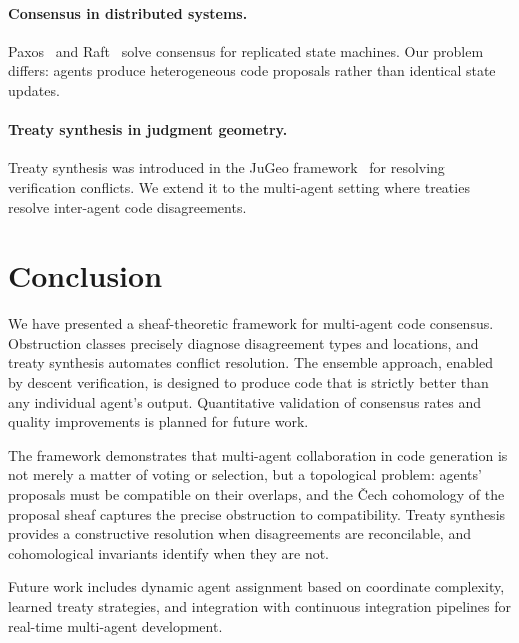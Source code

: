 \documentclass[11pt]{article}
\begin{document}
\paragraph{Consensus in distributed systems.}
Paxos~\cite{Lamport1998} and Raft~\cite{Ongaro2014} solve consensus
for replicated state machines.  Our problem differs: agents produce
heterogeneous code proposals rather than identical state updates.

\paragraph{Treaty synthesis in judgment geometry.}
Treaty synthesis was introduced in the JuGeo framework~\cite{JuGeo2024}
for resolving verification conflicts.  We extend it to the multi-agent
setting where treaties resolve inter-agent code disagreements.


\section{Conclusion}\label{sec:conclusion}

We have presented a sheaf-theoretic framework for multi-agent code
consensus.  Obstruction classes precisely diagnose disagreement types and
locations, and treaty synthesis automates conflict resolution.  The
ensemble approach, enabled by descent verification, is designed to produce
code that is strictly better than any individual agent's output.
Quantitative validation of consensus rates and quality improvements
is planned for future work.

The framework demonstrates that multi-agent collaboration in code
generation is not merely a matter of voting or selection, but a
topological problem: agents' proposals must be compatible on their
overlaps, and the \v{C}ech cohomology of the proposal sheaf captures
the precise obstruction to compatibility.  Treaty synthesis provides a
constructive resolution when disagreements are reconcilable, and
cohomological invariants identify when they are not.

Future work includes dynamic agent assignment based on coordinate
complexity, learned treaty strategies, and integration with continuous
integration pipelines for real-time multi-agent development.
\end{document}
